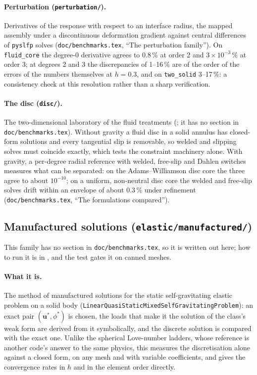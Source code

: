 \documentclass[11pt]{article}
\numberwithin{equation}{section}
\newcommand{\vu}{\mathbf{u}}
\newcommand{\code}[1]{\texttt{#1}}
\begin{document}
\paragraph{Perturbation (\code{perturbation/}).} Derivatives of the response
with respect to an interface radius, the mapped assembly under a
discontinuous deformation gradient against central differences of
\code{pyslfp} solves (\code{doc/benchmarks.tex}, ``The perturbation
family''). On \code{fluid\_core} the degree-0 derivative agrees to
$0.8\,\%$ at order 2 and $3\times10^{-3}\,\%$ at order 3; at degrees 2 and 3
the discrepancies of 1--16\,\% are of the order of the errors of the
numbers themselves at $h=0.3$, and on \code{two\_solid} 3--17\,\%: a
consistency check at this resolution rather than a sharp verification.

\paragraph{The disc (\code{disc/}).} The two-dimensional laboratory of the
fluid treatments (; it has no section in
\code{doc/benchmarks.tex}). Without gravity a fluid disc in a solid annulus
has closed-form solutions and every tangential slip is removable, so
welded and slipping solves must coincide exactly, which tests the constraint
machinery alone. With gravity, a per-degree radial reference with welded,
free-slip and Dahlen switches measures what can be separated: on the
Adams--Williamson disc core the three agree to about $10^{-10}$; on a
uniform, non-neutral disc core the welded and free-slip solves drift within
an envelope of about $0.3\,\%$ under refinement
(\code{doc/benchmarks.tex}, ``The formulations compared'').

\subsection{Manufactured solutions (\code{elastic/manufactured/})}
\label{sec:manufactured}

This family has no section in \code{doc/benchmarks.tex}, so it is written
out here; how to run it is in
, and the test
 gates it on canned meshes.

\paragraph{What it is.} The method of manufactured solutions for the static
self-gravitating elastic problem on a solid body
(\code{LinearQuasiStaticMixedSelfGravitatingProblem}): an exact pair
$(\vu^*,\phi^*)$ is chosen, the loads that make it the solution of the
class's weak form are derived from it symbolically, and the discrete
solution is compared with the exact one. Unlike the spherical Love-number
ladders, whose reference is another code's answer to the same physics, this
measures the discretisation alone against a closed form, on any mesh and
with variable coefficients, and gives the convergence rates in $h$ and in
the element order directly.
\end{document}
